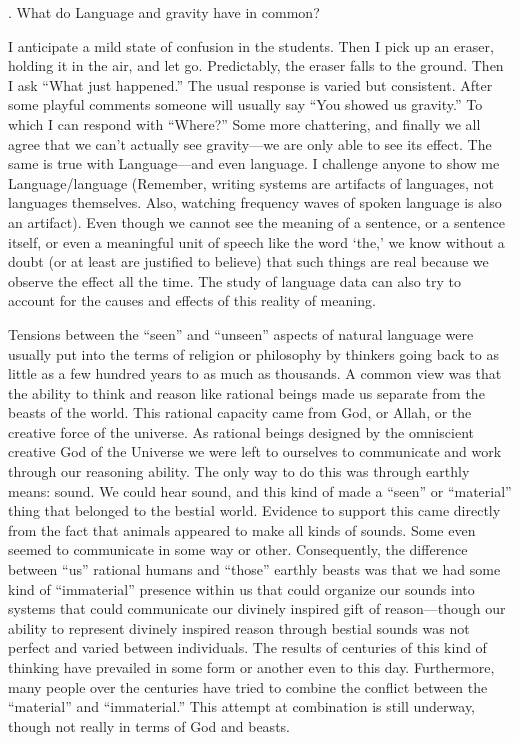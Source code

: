 \documentclass[11pt]{book}%
\theoremstyle{plain}
\numberwithin{equation}{section}
\theoremstyle{definition}
\newtheorem{phrase string}{Phrase String}
\begin{document}
\ex. What do Language and gravity have in common?

I anticipate a mild state of confusion in the students. Then I pick up an eraser, holding it in the air, and let go. Predictably, the eraser falls to the ground. Then I ask ``What just happened.'' The usual response is varied but consistent. After some playful comments someone will usually say ``You showed us gravity.'' To which I can respond with ``Where?'' Some more chattering, and finally we all agree that we can't actually see gravity---we are only able to see its effect. The same is true with Language---and even language. I challenge anyone to show me Language/language (Remember, writing systems are artifacts of languages, not languages themselves. Also, watching frequency waves of spoken language is also an artifact). Even though we cannot see the meaning of a sentence, or a sentence itself, or even a meaningful unit of speech like the word `the,' we know without a doubt (or at least are justified to believe) that such things are real because we observe the effect all the time. The study of language data can also try to account for the causes and effects of this reality of meaning.

Tensions between the ``seen'' and ``unseen'' aspects of natural language were usually put into the terms of religion or philosophy by thinkers going back to as little as a few hundred years to as much as thousands. A common view was that the ability to think and reason like rational beings made us separate from the beasts of the world. This rational capacity came from God, or Allah, or the creative force of the universe. As rational beings designed by the omniscient creative God of the Universe we were left to ourselves  to communicate and work through our reasoning ability. The only way to do this was through earthly means: sound. We could hear sound, and this kind of made a ``seen'' or ``material'' thing that belonged to the bestial world. Evidence to support this came directly from the fact that animals appeared to make all kinds of sounds. Some even seemed to communicate in some way or other. Consequently, the difference between ``us'' rational humans and ``those'' earthly beasts was that we had some kind of ``immaterial'' presence within us that could organize our sounds into systems that could communicate our divinely inspired gift of reason---though our ability to represent divinely inspired reason through bestial sounds was not perfect and varied between individuals. The results of centuries of this kind of thinking have prevailed in some form or another even to this day. Furthermore, many people over the centuries have tried to combine the conflict between the ``material'' and ``immaterial.'' This attempt at combination is still underway, though not really in terms of God and beasts.
\end{document}
